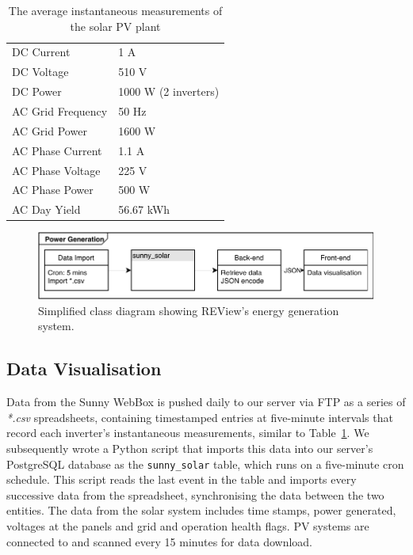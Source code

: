 \begin{table}[H]
	\centering
	\caption{The average instantaneous measurements of the solar PV plant}
	\label{tbl:9:pg}
	\begin{tabular}{ll}
		\toprule
		DC Current        & 1 A                  \\
		DC Voltage        & 510 V                \\
		DC Power          & 1000 W (2 inverters) \\
		AC Grid Frequency & 50 Hz                \\
		AC Grid Power     & 1600 W               \\
		AC Phase Current  & 1.1 A                \\
		AC Phase Voltage  & 225 V                \\
		AC Phase Power    & 500 W                \\
		AC Day Yield      & 56.67 kWh            \\ \bottomrule
	\end{tabular}
\end{table}

\begin{figure}[H]
	\centering
	\includegraphics[width=\linewidth]{uml-pg}
	\caption{Simplified class diagram showing REView’s energy generation system.}
	\label{fig:9:uml-pg}
\end{figure}

\subsection{Data Visualisation}
Data from the Sunny WebBox is pushed daily to our server via FTP as a series of \textit{*.csv} spreadsheets, containing timestamped entries at five-minute intervals that record each inverter's instantaneous measurements, similar to Table~\ref{tbl:9:pg}. We subsequently wrote a Python script that imports this data into our server's PostgreSQL database as the \texttt{sunny\_solar} table, which runs on a five-minute cron schedule. This script reads the last event in the table and imports every successive data from the spreadsheet, synchronising the data between the two entities. The data from the solar system includes time stamps, power generated, voltages at the panels and grid and operation health flags. PV systems are connected to and scanned every 15 minutes for data download.

